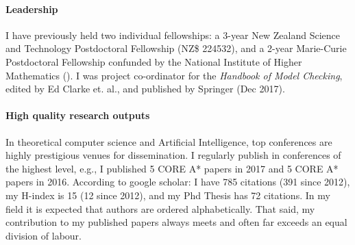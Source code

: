 \documentclass[a4paper,12pt]{scrartcl}
\renewcommand{\todo}[1]{}
\begin{document}
\paragraph{Leadership}


I have previously held two individual fellowships: a 3-year New Zealand Science and Technology Postdoctoral Fellowship (NZ\$ 224532), and a 2-year Marie-Curie Postdoctoral Fellowship confunded by the National Institute of Higher Mathematics (). I was project co-ordinator for the \emph{Handbook of Model Checking}, edited by Ed Clarke et. al., and published by Springer (Dec 2017).

\paragraph{High quality research outputs}



In theoretical computer science and Artificial Intelligence, top conferences are highly prestigious venues for dissemination. I regularly publish in conferences of the highest level, e.g., I published 5 CORE A* papers in 2017 and 5 CORE A* papers in 2016. According to google scholar: I have 785 citations (391 since 2012), my H-index is 15 (12 since 2012), and my Phd Thesis has 72 citations. In my field it is expected that authors are ordered alphabetically. That said, my contribution to my published papers always meets and often far exceeds an equal division of labour. 
\end{document}
